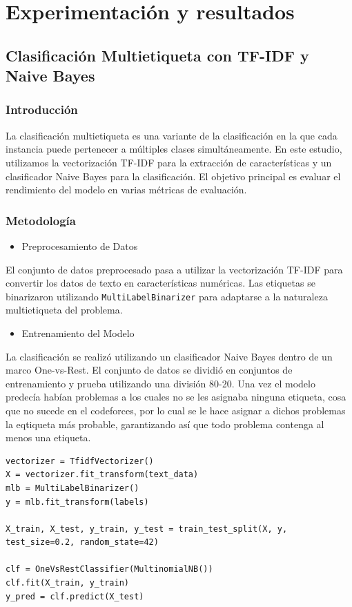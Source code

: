 \documentclass{article}
\begin{document}
\section{Experimentación y resultados}
	\subsection{Clasificación Multietiqueta con TF-IDF y Naive Bayes}
		\subsubsection{Introducción}
La clasificación multietiqueta es una variante de la clasificación en la que cada instancia puede pertenecer a múltiples clases simultáneamente. En este estudio, utilizamos la vectorización TF-IDF para la extracción de características y un clasificador Naive Bayes para la clasificación. El objetivo principal es evaluar el rendimiento del modelo en varias métricas de evaluación.
		\subsubsection{Metodología}
			\begin{itemize}
    \item Preprocesamiento de Datos
\end{itemize}
El conjunto de datos preprocesado pasa a utilizar la vectorización TF-IDF para convertir los datos de texto en características numéricas. Las etiquetas se binarizaron utilizando \texttt{MultiLabelBinarizer} para adaptarse a la naturaleza multietiqueta del problema.

\begin{itemize}
    \item Entrenamiento del Modelo
\end{itemize}
La clasificación se realizó utilizando un clasificador Naive Bayes dentro de un marco One-vs-Rest. El conjunto de datos se dividió en conjuntos de entrenamiento y prueba utilizando una división 80-20. Una vez el modelo predecía habían problemas a los cuales no se les
asignaba ninguna etiqueta, cosa que no sucede en el codeforces, por lo cual se le hace asignar a dichos problemas la eqtiqueta más probable, garantizando así que todo problema contenga al menos una etiqueta.
\begin{verbatim}
vectorizer = TfidfVectorizer()
X = vectorizer.fit_transform(text_data)
mlb = MultiLabelBinarizer()
y = mlb.fit_transform(labels)

X_train, X_test, y_train, y_test = train_test_split(X, y, test_size=0.2, random_state=42)

clf = OneVsRestClassifier(MultinomialNB())
clf.fit(X_train, y_train)
y_pred = clf.predict(X_test)
\end{verbatim}
\end{document}
